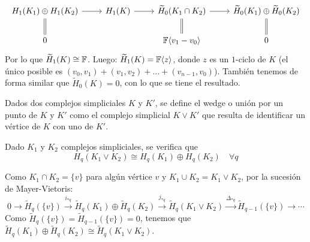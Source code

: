 \documentclass[HS.tex]{subfiles}
\begin{document}
\begin{ej}
\begin{enumerate}
\[
\begin{tikzcd}
 H_1(K_1)\oplus H_1(K_2)\arrow[d,equal]\arrow[r] & H_1(K)\arrow[r] & \widetilde{H}_0(K_1\cap K_2)\arrow[d,equal]\arrow[r] & \widetilde{H}_0(K_1)\oplus \widetilde{H}_0(K_2)\arrow[d,equal]\\
                    0                              &                 &  \F\gene{v_1-v_0} & 0
\end{tikzcd}
\]
Por lo que $\widetilde{H}_1(K)\cong\mathbb{F}$. Luego: $\widetilde{H}_1(K)=\mathbb{F}\langle{z}\rangle$, donde $z$ es un $1$-ciclo de $K$ (el único posible es $(v_0,v_1)+(v_1,v_2)+\dots+(v_{n-1},v_0)$).
También tenemos de forma similar que $\widetilde{H}_0(K)=0$, con lo que se tiene el resultado. 
\end{enumerate}
\end{ej}

\begin{defi}
Dados dos complejos simpliciales $K$ y $K'$, se define el wedge o unión por un punto de $K$ y $K'$ como el complejo simplicial $K \lor K'$ que resulta de identificar un vértice de $K$ con uno de $K'$.
\end{defi}

\begin{prop}
Dado $K_1$ y $K_2$ complejos simpliciales, se verifica que
\[ H_q(K_1 \lor K_2) \cong H_q(K_1) \oplus H_q(K_2) \quad \forall q\]
\end{prop}
\begin{dem}
Como $K_1 \cap K_2 = \{v\}$ para algún vértice $v$ y $K_1 \cup K_2 = K_1 \lor K_2$, por la sucesión de Mayer-Vietoris:
\[
0 \to \widetilde{H}_q(\{v\}) \xrightarrow{i_{*q}} \widetilde{H}_q(K_1)\oplus \widetilde{H}_q(K_2) \xrightarrow{j_{*q}} \widetilde{H}_q(K_1\lor K_2) \xrightarrow{\Delta_{*q}} \widetilde{H}_{q-1}(\{v\})\to\cdots
\]
Como $\widetilde{H}_q(\{v\}) = \widetilde{H}_{q-1}(\{v\}) = 0$, tenemos que $\widetilde{H}_q(K_1)\oplus \widetilde{H}_q(K_2) \cong \widetilde{H}_q(K_1\lor K_2)$.
\end{dem}
\end{document}
